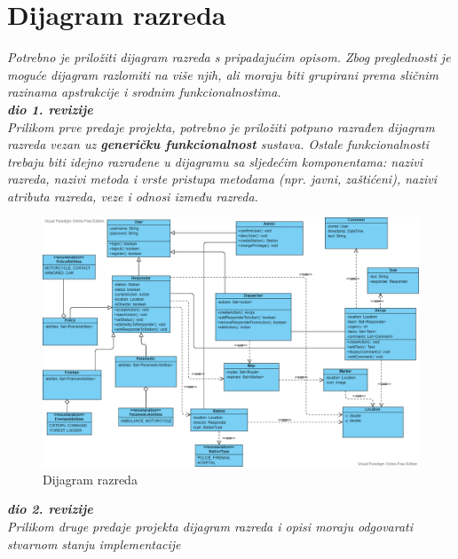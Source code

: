 			\eject
			
			
		\section{Dijagram razreda}
		
			\textit{Potrebno je priložiti dijagram razreda s pripadajućim opisom. Zbog preglednosti je moguće dijagram razlomiti na više njih, ali moraju biti grupirani prema sličnim razinama apstrakcije i srodnim funkcionalnostima.}\\
			
			\textbf{\textit{dio 1. revizije}}\\
		
			\textit{Prilikom prve predaje projekta, potrebno je priložiti potpuno razrađen dijagram razreda vezan uz \textbf{generičku funkcionalnost} sustava. Ostale funkcionalnosti trebaju biti idejno razrađene u dijagramu sa sljedećim komponentama: nazivi razreda, nazivi metoda i vrste pristupa metodama (npr. javni, zaštićeni), nazivi atributa razreda, veze i odnosi između razreda.}\\
			
			\begin{figure}[H]
				\includegraphics[scale=0.4]{slike/classes.PNG}
				\centering
				\caption{Dijagram razreda}
				\label{fig:razredi}
			\end{figure}
			
			\textbf{\textit{dio 2. revizije}}\\			
			
			\textit{Prilikom druge predaje projekta dijagram razreda i opisi moraju odgovarati stvarnom stanju implementacije}
			
			
			
